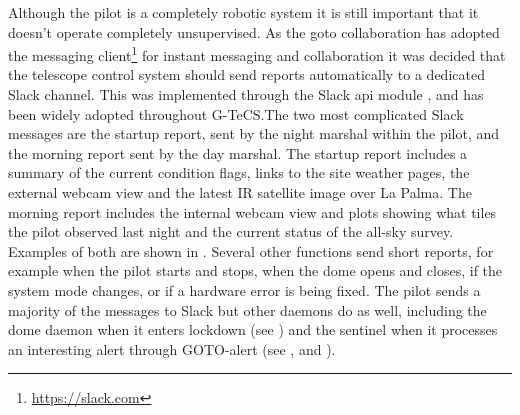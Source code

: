 \begin{colsection}
\begin{colsection}
Although the pilot is a completely robotic system it is still important that it doesn't operate completely unsupervised. As the \gls{goto} collaboration has adopted the  messaging client\footnote{\url{https://slack.com}} for instant messaging and collaboration it was decided that the telescope control system should send reports automatically to a dedicated Slack channel. This was implemented through the  Slack \gls{api} module , and has been widely adopted throughout G-TeCS.\@ The two most complicated Slack messages are the startup report, sent by the night marshal within the pilot, and the morning report sent by the day marshal. The startup report includes a summary of the current condition flags, links to the site weather pages, the external webcam view and the latest IR satellite image over La Palma. The morning report includes the internal webcam view and plots showing what tiles the pilot observed last night and the current status of the all-sky survey. Examples of both are shown in . Several other functions send short reports, for example when the pilot starts and stops, when the dome opens and closes, if the system mode changes, or if a hardware error is being fixed. The pilot sends a majority of the messages to Slack but other daemons do as well, including the dome daemon when it enters lockdown (see ) and the sentinel when it processes an interesting alert through GOTO-alert (see ,  and ).


\end{colsection}
\end{colsection}
